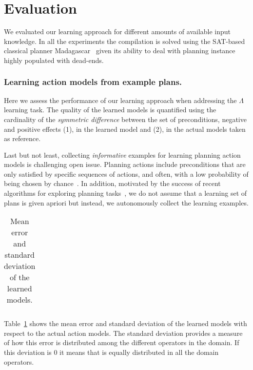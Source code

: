 \documentclass[letterpaper]{article} %
\begin{document}
\section{Evaluation}
We evaluated our learning approach for different amounts of available input knowledge. In all the experiments the compilation is solved using the SAT-based classical planner {\sc Madagascar}~\cite{rintanen2014madagascar} given its ability to deal with planning instance highly populated with dead-ends.

\subsubsection{Learning action models from example plans.}
Here we assess the performance of our learning approach when addressing the $\Lambda$ learning task. The quality of the learned models is quantified using the cardinality of the {\em symmetric difference} between the set of preconditions, negative and positive effects (1), in the learned model and (2), in the actual models taken as reference. 

Last but not least, collecting {\em informative} examples for learning planning action models is challenging open issue. Planning actions include preconditions that are only satisfied by specific sequences of actions, and often, with a low probability of being chosen by chance~\cite{fern2004learning}. In addition, motivated by the success of recent algorithms for exploring planning tasks~\cite{geffner:pwithsimulators:IJCAI17}, we do not assume that a learning set of plans is given apriori but instead, we autonomously collect the learning examples.

\begin{table}[hbt!]
\begin{footnotesize}
\begin{tabular}{cc}


\end{tabular}
\end{footnotesize}
\caption{\small Mean error and standard deviation of the learned models.}
  \label{tab:eplans}
\end{table}

Table~\ref{tab:eplans} shows the mean error and standard deviation of the learned models with respect to the actual action models. The standard deviation provides a measure of how this error is distributed among the different operators in the domain. If this deviation is 0 it means that is equally distributed in all the domain operators.
\end{document}

